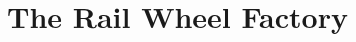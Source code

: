 \newpage


\cleardoublepage
\tableofcontents
\mainmatter%
\pagestyle{headings}





\chapter[The Rail Wheel Factory]{The Rail Wheel Factory}
\renewcommand\chapterillustration{img/IRlogo.jpg}

\newpage
%
%


\cleardoublepage

\newpage
%
%


